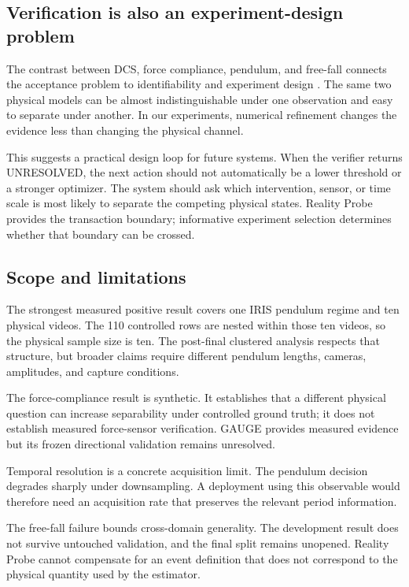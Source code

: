 \documentclass[acmtog]{acmart}
\begin{document}
\subsection{Verification is also an experiment-design problem}\label{relation-to-identifiability-and-experiment-design}

The contrast between DCS, force compliance, pendulum, and free-fall connects the acceptance problem to identifiability and experiment design \citep{wang2026identifiability,asadi2025oed}. The same two physical models can be almost indistinguishable under one observation and easy to separate under another. In our experiments, numerical refinement changes the evidence less than changing the physical channel.

This suggests a practical design loop for future systems. When the verifier returns UNRESOLVED, the next action should not automatically be a lower threshold or a stronger optimizer. The system should ask which intervention, sensor, or time scale is most likely to separate the competing physical states. Reality Probe provides the transaction boundary; informative experiment selection determines whether that boundary can be crossed.

\subsection{Scope and limitations}\label{limitations}

The strongest measured positive result covers one IRIS pendulum regime and ten physical videos. The 110 controlled rows are nested within those ten videos, so the physical sample size is ten. The post-final clustered analysis respects that structure, but broader claims require different pendulum lengths, cameras, amplitudes, and capture conditions.

The force-compliance result is synthetic. It establishes that a different physical question can increase separability under controlled ground truth; it does not establish measured force-sensor verification. GAUGE provides measured evidence but its frozen directional validation remains unresolved.

Temporal resolution is a concrete acquisition limit. The pendulum decision degrades sharply under downsampling. A deployment using this observable would therefore need an acquisition rate that preserves the relevant period information.

The free-fall failure bounds cross-domain generality. The development result does not survive untouched validation, and the final split remains unopened. Reality Probe cannot compensate for an event definition that does not correspond to the physical quantity used by the estimator.
\end{document}
